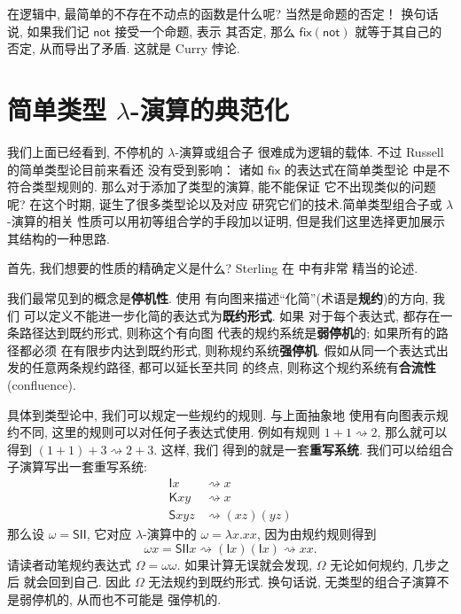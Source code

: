\documentclass[UTF8]{ctexbook}
\newcommand{\cons}[1]{\textsf{#1}}
\theoremstyle{plain}
\theoremstyle{definition}
\theoremstyle{remark}
\begin{document}
在逻辑中, 最简单的不存在不动点的函数是什么呢? 当然是命题的否定！
换句话说, 如果我们记 \(\cons{not}\) 接受一个命题, 表示
其否定, 那么 \(\cons{fix}(\cons{not})\) 就等于其自己的否定,
从而导出了矛盾. 这就是 Curry 悖论.

\section{简单类型 \texorpdfstring{\(\lambda\)}{Lambda}-演算的典范化}
\label{beginning:ccc}
\begin{center}%
\end{center}

我们上面已经看到, 不停机的 \(\lambda\)-演算或组合子
很难成为逻辑的载体. 不过 Russell 的简单类型论目前来看还
没有受到影响： 诸如 \(\cons{fix}\) 的表达式在简单类型论
中是不符合类型规则的. 那么对于添加了类型的演算, 能不能保证
它不出现类似的问题呢? 在这个时期, 诞生了很多类型论以及对应
研究它们的技术.简单类型组合子或 \(\lambda\)-演算的相关
性质可以用初等组合学的手段加以证明\cite{loader:1998:stlc},
但是我们这里选择更加展示其结构的一种思路\cite[\S4.2]{sterling:2021:thesis}.

首先, 我们想要的性质的精确定义是什么? Sterling
在 \cite[\S5.1]{sterling:2021:thesis} 中有非常
精当的论述.

我们最常见到的概念是\textbf{停机性}. 使用
有向图来描述“化简”(术语是\textbf{规约})的方向, 我们
可以定义不能进一步化简的表达式为\textbf{既约形式}. 如果
对于每个表达式, 都存在一条路径达到既约形式, 则称这个有向图
代表的规约系统是\textbf{弱停机}的; 如果所有的路径都必须
在有限步内达到既约形式, 则称规约系统\textbf{强停机}.
假如从同一个表达式出发的任意两条规约路径, 都可以延长至共同
的终点, 则称这个规约系统有\textbf{合流性}(confluence).

具体到类型论中, 我们可以规定一些规约的规则. 与上面抽象地
使用有向图表示规约不同, 这里的规则可以对任何子表达式使用.
例如有规则 \(1 + 1 \rightsquigarrow 2\), 那么就可以
得到 \((1+1)+3 \rightsquigarrow 2 + 3\). 这样, 我们
得到的就是一套\textbf{重写系统}. 我们可以给组合子演算写出一套重写系统:
\[\begin{aligned}
\cons{I}x & \rightsquigarrow x\\
\cons{K}xy &\rightsquigarrow x\\
\cons{S}xyz &\rightsquigarrow (xz)(yz)
\end{aligned}\]
那么设 \(\omega = \cons{S}\cons{I}\cons{I}\),
它对应 \(\lambda\)-演算中的 \(\omega = \lambda x. xx\),
因为由规约规则得到
\[\omega x = \cons{S}\cons{I}\cons{I}x \rightsquigarrow (\cons{I}x)(\cons{I}x) \rightsquigarrow xx.\]
请读者动笔规约表达式 \(\Omega = \omega\omega\).
如果计算无误就会发现, \(\Omega\) 无论如何规约, 几步之后
就会回到自己. 因此 \(\Omega\) 无法规约到既约形式.
换句话说, 无类型的组合子演算不是弱停机的, 从而也不可能是
强停机的.
\end{document}
